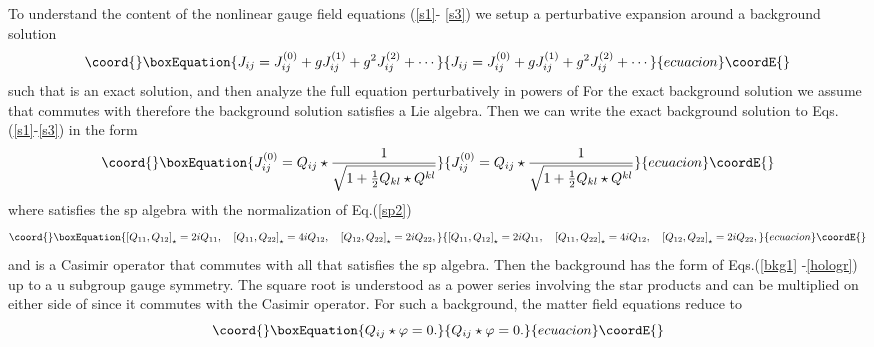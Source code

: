 \documentclass[a4paper,12pt]{article}
\begin{document}
To understand the content of the nonlinear gauge field equations
(\ref{s1}- \ref{s3}) we setup a perturbative expansion around a
background solution
\begin{equation}\coord{}\boxEquation{
J_{ij}=J_{ij}^{\left( 0\right) }+gJ_{ij}^{\left( 1\right)
}+g^{2}J_{ij}^{\left( 2\right) }+\cdots
}{
J_{ij}=J_{ij}^{\left( 0\right) }+gJ_{ij}^{\left( 1\right)
}+g^{2}J_{ij}^{\left( 2\right) }+\cdots
}{ecuacion}\coordE{}\end{equation}
such that \coordHE{} is an exact solution, and
then analyze the full equation perturbatively in powers of \coordHE{}
For the exact background solution we assume that
\coordHE{} commutes
with \coordHE{} therefore the background
solution satisfies a Lie algebra. Then we can write the exact
background solution to Eqs.(\ref{s1}-\ref{s3}) in the form
\begin{equation}\coord{}\boxEquation{
J_{ij}^{\left( 0\right) }=Q_{ij}\star \frac{1}{\sqrt{1+\frac{1}{2}
Q_{kl}\star Q^{kl}}}  \label{JQ}
}{
J_{ij}^{\left( 0\right) }=Q_{ij}\star \frac{1}{\sqrt{1+\frac{1}{2}
Q_{kl}\star Q^{kl}}}  }{ecuacion}\coordE{}\end{equation}
where \coordHE{} satisfies the sp\coordHE{} algebra with
the normalization of Eq.(\ref{sp2})
\begin{equation}\coord{}\boxEquation{
\left[ Q_{11},Q_{12}\right] _{\star }=2iQ_{11},\quad \left[
Q_{11},Q_{22} \right] _{\star }=4iQ_{12},\quad \left[
Q_{12},Q_{22}\right] _{\star }=2iQ_{22},  \label{Qalg}
}{
\left[ Q_{11},Q_{12}\right] _{\star }=2iQ_{11},\quad \left[
Q_{11},Q_{22} \right] _{\star }=4iQ_{12},\quad \left[
Q_{12},Q_{22}\right] _{\star }=2iQ_{22},  }{ecuacion}\coordE{}\end{equation}
and \coordHE{} is a Casimir operator that
commutes with all \coordHE{} that satisfies the sp\coordHE{} algebra. Then the background \coordHE{}
has the form of Eqs.(\ref{bkg1} -\ref{hologr}) up to a u\myHighlight{$_{\star
}\left( 1\right) $}\coordHE{} subgroup gauge symmetry. The square root is
understood as a power series involving the star products and can
be multiplied on either side of \coordHE{} since it commutes with
the Casimir operator. For such a background, the matter field
equations reduce to
\begin{equation}\coord{}\boxEquation{
Q_{ij}\star \varphi =0.  \label{Qphi}
}{
Q_{ij}\star \varphi =0.  }{ecuacion}\coordE{}\end{equation}
\end{document}
